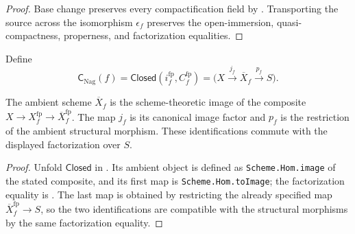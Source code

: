 \begin{proof}
  Base change preserves every compactification field by
  .  Transporting the source
  across the isomorphism $\epsilon_f$ preserves the open-immersion,
  quasi-compactness, properness, and factorization equalities.
\end{proof}

\begin{definition}

  \label{def:nagata-final-compactification}

  Define
  \[
    \mathsf C_{\mathrm{Nag}}(f)
      =\mathsf{Closed}(i_f^{\mathrm{fp}},C_f^{\mathrm{fp}})
      =\bigl(X\xrightarrow{j_f}\overline X_f
        \xrightarrow{p_f}S\bigr).
  \]
\end{definition}

\begin{lemma}
  \label{lemma:nagata-final-compactification-spec}

  The ambient scheme $\overline X_f$ is the scheme-theoretic image of the
  composite
  $X\to X_f^{\mathrm{fp}}\to\overline X_f^{\mathrm{fp}}$.  The map
  $j_f$ is its canonical image factor and $p_f$ is the restriction of the
  ambient structural morphism.  These identifications commute with the
  displayed factorization over $S$.
\end{lemma}

\begin{proof}
  Unfold $\mathsf{Closed}$ in
  .  Its ambient object is defined as
  \texttt{Scheme.Hom.image} of the stated composite, and its first map is
  \texttt{Scheme.Hom.toImage}; the factorization equality is
  .  The last map is obtained by
  restricting the already specified map
  $\overline X_f^{\mathrm{fp}}\to S$, so the two identifications are
  compatible with the structural morphisms by the same factorization
  equality.
\end{proof}

